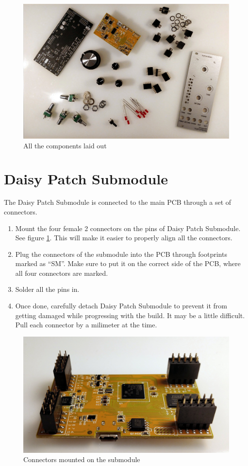 \documentclass[10pt,a4paper,twocolumn]{article}
\begin{document}
\begin{figure}[p]
  \centering
  \includegraphics[width=\linewidth]{p01.jpg}
  \caption{All the components laid out}
\end{figure}

\section{Daisy Patch Submodule}

The Daisy Patch Submodule is connected to the main PCB through a set of connectors.

\begin{enumerate}
  \item Mount the four female 2 connectors on the pins of Daisy Patch Submodule. See figure \ref{daisy}. This will make it easier to properly align all the connectors.
  \item Plug the connectors of the submodule into the PCB through footprints marked as ``SM''. Make sure to put it on the correct side of the PCB, where all four connectors are marked.
  \item Solder all the pins in.
  \item Once done, carefully detach Daisy Patch Submodule to prevent it from getting damaged while progressing with the build. It may be a little difficult. Pull each connector by a milimeter at the time.
\end{enumerate}

\begin{figure}[p]
  \centering
  \includegraphics[width=\linewidth]{p02.jpg}
  \caption{Connectors mounted on the submodule}
  \label{daisy}
\end{figure}
\end{document}
